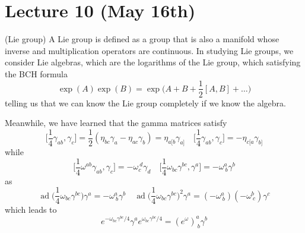 \section{Lecture 10 (May 16th)}
\begin{defi}
(Lie group) A Lie group is defined as a group that is also a manifold whose inverse and multiplication operators are continuous. In studying Lie groups, we consider Lie algebras, which are the logarithms of the Lie group, which satisfying the BCH formula
\[\exp (A)\exp (B)=\exp\Big(A+B+\dfrac{1}{2}[A,B]+\ldots \Big) \]
telling us that we can know the Lie group completely if we know the algebra.
\end{defi}
\vspace{2ex}
\begin{recall}
Meanwhile, we have learned that the gamma matrices satisfy
\[
\Big[\dfrac{1}{4}\gamma _{ab},\gamma _{c}\Big]=\dfrac{1}{2}(\eta _{bc}\gamma _{a}-\eta _{ac}\gamma _{b})=\eta_{a[b}\gamma _{a]}\quad \Big[\dfrac{1}{4}\gamma _{ab},\gamma _{c}\Big]=-\eta _{c[a}\gamma _{b]}
\]
while 
\[\Big[\dfrac{1}{4}\omega ^{ab}\gamma _{ab},\gamma _{c}\Big]=-\omega _{c}^{\ d}\gamma _{d}\quad \Big[\dfrac{1}{4}\omega _{bc}\gamma ^{bc},\gamma ^{a}\Big]=-\omega ^{a}_{\ b}\gamma ^{b}\]
as
\[\mathop{\mathrm{ad}}\Big(\dfrac{1}{4}\omega _{bc}\gamma ^{bc}\Big)\gamma ^{a}=-\omega ^{a}_{\ b}\gamma ^{b}\quad \mathop{\mathrm{ad}}\Big(\dfrac{1}{4}\omega _{bc}\gamma ^{bc}\Big)^{2}\gamma ^{a}=(-\omega ^{a}_{\ b})(-\omega ^{b}_{\ c})\gamma ^{c}\]
which leads to
\[e^{-\omega _{bc}\gamma ^{bc}/4}\gamma^{a}e^{\omega _{bc}\gamma ^{bc}/4}=(e^{\omega })^{a}_{\ b}\gamma ^{b}\]
\end{recall}
\vspace{2ex}

